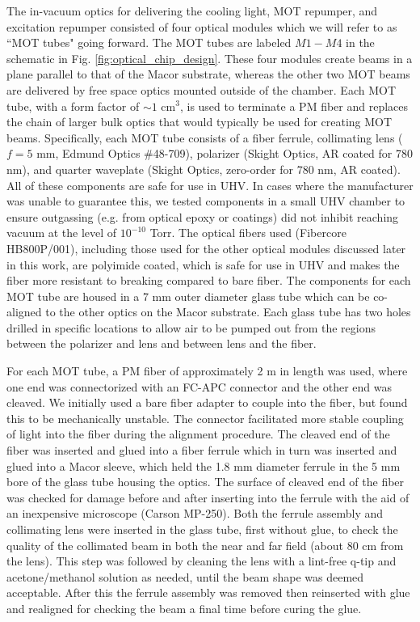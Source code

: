 The in-vacuum optics for delivering the cooling light, MOT repumper, and excitation repumper consisted of four optical modules which we will refer to as ``MOT tubes" going forward. The MOT tubes are labeled $M1-M4$ in the schematic in Fig. \ref{fig:optical_chip_design}. These four modules create beams in a plane parallel to that of the Macor substrate, whereas the other two MOT beams are delivered by free space optics mounted outside of the chamber. Each MOT tube, with a form factor of $\sim1$ cm$^3$, is used to terminate a PM fiber and replaces the chain of larger bulk optics that would typically be used for creating MOT beams. Specifically, each MOT tube consists of a fiber ferrule, collimating lens ($f=5$ mm, Edmund Optics $\#$48-709), polarizer (Skight Optics, AR coated for 780 nm), and quarter waveplate (Skight Optics, zero-order for 780 nm, AR coated). All of these components are safe for use in UHV. In cases where the manufacturer was unable to guarantee this, we tested components in a small UHV chamber to ensure outgassing (e.g. from optical epoxy or coatings) did not inhibit reaching vacuum at the level of $10^{-10}$ Torr. The optical fibers used (Fibercore HB800P/001), including those used for the other optical modules discussed later in this work, are polyimide coated, which is safe for use in UHV and makes the fiber more resistant to breaking compared to bare fiber. The components for each MOT tube are housed in a 7 mm outer diameter glass tube which can be co-aligned to the other optics on the Macor substrate. Each glass tube has two holes drilled in specific locations to allow air to be pumped out from the regions between the polarizer and lens and between lens and the fiber.

For each MOT tube, a PM fiber of approximately 2 m in length was used, where one end was connectorized with an FC-APC connector and the other end was cleaved. We initially used a bare fiber adapter to couple into the fiber, but found this to be mechanically unstable. The connector facilitated more stable coupling of light into the fiber during the alignment procedure. The cleaved end of the fiber was inserted and glued into a fiber ferrule which in turn was inserted and glued into a Macor sleeve, which held the 1.8 mm diameter ferrule in the 5 mm bore of the glass tube housing the optics. The surface of cleaved end of the fiber was checked for damage before and after inserting into the ferrule with the aid of an inexpensive microscope (Carson MP-250). Both the ferrule assembly and collimating lens were inserted in the glass tube, first without glue, to check the quality of the collimated beam in both the near and far field (about 80 cm from the lens). This step was followed by cleaning the lens with a lint-free q-tip and acetone/methanol solution as needed, until the beam shape was deemed acceptable. After this the ferrule assembly was removed then reinserted with glue and realigned for checking the beam a final time before curing the glue. 

